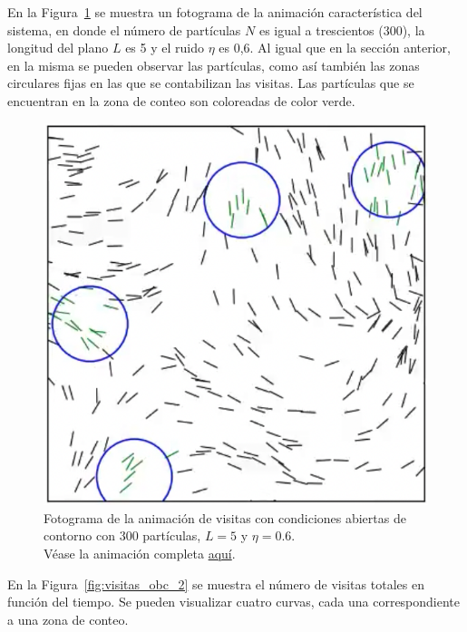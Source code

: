 \documentclass[11pt, a4paper]{article}
\begin{document}
            En la Figura~\ref{fig:visitas_obc_1} se muestra un fotograma de la animación característica del sistema, en donde
            el número de partículas $N$ es igual a trescientos (300), la longitud del plano $L$ es 5 y el ruido $\eta$ es 0,6.
            Al igual que en la sección anterior, en la misma se pueden observar las partículas, como así también las
            zonas circulares fijas en las que se contabilizan las visitas.
            Las partículas que se encuentran en la zona de conteo son coloreadas de color verde.

            \begin{figure}[H]
                \centering
                \includegraphics[width=\textwidth]{./animation_visits_obc-n300-eta0p6-frame}
                \caption{Fotograma de la animación de visitas con condiciones abiertas de contorno con $300$ partículas, $L = 5$ y $\eta = 0.6$.\\Véase la animación completa \href{https://youtu.be/ZcCPUwjMHBc}{aquí}.}
                \label{fig:visitas_obc_1}
            \end{figure}

            En la Figura~\ref{fig:visitas_obc_2} se muestra el número de visitas totales en función del tiempo.
            Se pueden visualizar cuatro curvas, cada una correspondiente a una zona de conteo.
\end{document}
